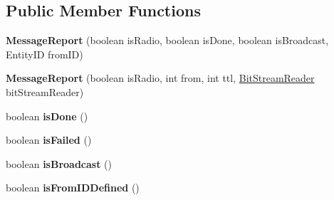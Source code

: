 \subsection*{Public Member Functions}
\begin{DoxyCompactItemize}
\item 
\hypertarget{classadf_1_1agent_1_1communication_1_1standard_1_1bundle_1_1centralized_1_1MessageReport_a1b64614f515d5fe01aa3750c8bdbf9b0}{}\label{classadf_1_1agent_1_1communication_1_1standard_1_1bundle_1_1centralized_1_1MessageReport_a1b64614f515d5fe01aa3750c8bdbf9b0} 
{\bfseries Message\+Report} (boolean is\+Radio, boolean is\+Done, boolean is\+Broadcast, Entity\+ID from\+ID)
\item 
\hypertarget{classadf_1_1agent_1_1communication_1_1standard_1_1bundle_1_1centralized_1_1MessageReport_af126fb1945ab9718067b55d0dd50658b}{}\label{classadf_1_1agent_1_1communication_1_1standard_1_1bundle_1_1centralized_1_1MessageReport_af126fb1945ab9718067b55d0dd50658b} 
{\bfseries Message\+Report} (boolean is\+Radio, int from, int ttl, \hyperlink{classadf_1_1component_1_1communication_1_1util_1_1BitStreamReader}{Bit\+Stream\+Reader} bit\+Stream\+Reader)
\item 
\hypertarget{classadf_1_1agent_1_1communication_1_1standard_1_1bundle_1_1centralized_1_1MessageReport_aef3d878f86d949beeb4b9c5450f6cf9b}{}\label{classadf_1_1agent_1_1communication_1_1standard_1_1bundle_1_1centralized_1_1MessageReport_aef3d878f86d949beeb4b9c5450f6cf9b} 
boolean {\bfseries is\+Done} ()
\item 
\hypertarget{classadf_1_1agent_1_1communication_1_1standard_1_1bundle_1_1centralized_1_1MessageReport_a6a56947c3c224a169464f5158595eabe}{}\label{classadf_1_1agent_1_1communication_1_1standard_1_1bundle_1_1centralized_1_1MessageReport_a6a56947c3c224a169464f5158595eabe} 
boolean {\bfseries is\+Failed} ()
\item 
\hypertarget{classadf_1_1agent_1_1communication_1_1standard_1_1bundle_1_1centralized_1_1MessageReport_aec30df4b7376f6e2d19ac6c52cec660c}{}\label{classadf_1_1agent_1_1communication_1_1standard_1_1bundle_1_1centralized_1_1MessageReport_aec30df4b7376f6e2d19ac6c52cec660c} 
boolean {\bfseries is\+Broadcast} ()
\item 
\hypertarget{classadf_1_1agent_1_1communication_1_1standard_1_1bundle_1_1centralized_1_1MessageReport_ad56cac1b5661d772a4193f8ac5543b58}{}\label{classadf_1_1agent_1_1communication_1_1standard_1_1bundle_1_1centralized_1_1MessageReport_ad56cac1b5661d772a4193f8ac5543b58} 
boolean {\bfseries is\+From\+I\+D\+Defined} ()

\end{DoxyCompactItemize}
